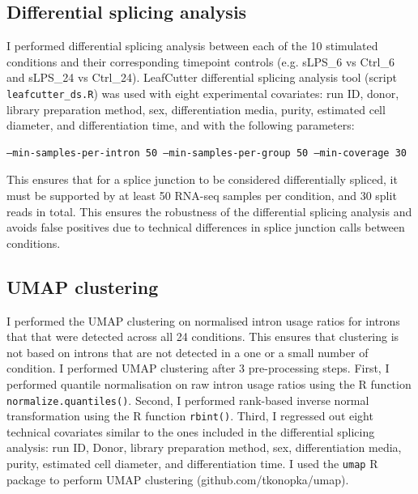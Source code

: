 \subsection{Differential splicing analysis}
I performed differential splicing analysis between each of the 10 stimulated conditions and their corresponding timepoint controls (e.g. sLPS\_6 vs Ctrl\_6 and sLPS\_24 vs Ctrl\_24). LeafCutter differential splicing analysis tool (script \Verb+leafcutter_ds.R+) \cite{Li2018-ll} was used with eight experimental covariates: run ID, donor, library preparation method, sex, differentiation media, purity, estimated cell diameter, and differentiation time, and with  the following parameters:
\begin{verbatim}
–min-samples-per-intron 50 –min-samples-per-group 50 –min-coverage 30
\end{verbatim}
This ensures that for a splice junction to be considered differentially spliced, it must be supported by at least 50 RNA-seq samples per condition, and 30 split reads in total. This ensures the robustness of the differential splicing analysis and avoids false positives due to technical differences in splice junction calls between conditions.

\subsection{UMAP clustering}
I performed the UMAP clustering on normalised intron usage ratios for introns that that were detected across all 24 conditions. This ensures that clustering is not based on introns that are not detected in a one or a small number of condition. I performed UMAP clustering after 3 pre-processing steps. First, I performed quantile normalisation on raw intron usage ratios using the R function \Verb+normalize.quantiles()+. Second, I performed rank-based inverse normal transformation using the R function \Verb+rbint()+. Third, I regressed out eight technical covariates similar to the ones included in the differential splicing analysis: run ID, Donor, library preparation method, sex, differentiation media, purity, estimated cell diameter, and differentiation time. I used the \Verb+umap+ R package to perform UMAP clustering \cite{McInnes2018-fe} (github.com/tkonopka/umap). 

